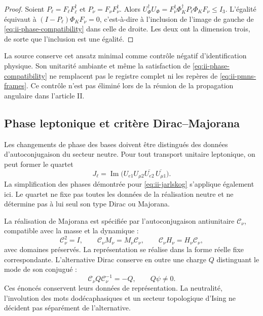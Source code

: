\begin{proof}
Soient \(P_\ell=F_\ell F_\ell^\dagger\) et
\(P_\nu=F_\nu F_\nu^\dagger\). Alors
\(U_\Phi^\dagger U_\Phi
=F_\nu^\dagger\Phi_K^\dagger P_\ell\Phi_KF_\nu\le I_3\).
L'égalité équivaut à
\((I-P_\ell)\Phi_KF_\nu=0\), c'est-à-dire à l'inclusion de
l'image de gauche de \eqref{eq:ii-phase-compatibility} dans celle de droite.
Les deux ont la dimension trois, de sorte que l'inclusion est une égalité.
\end{proof}

La source \cite{mezcla} conserve cet ansatz minimal comme contrôle
négatif d'identification physique. Son unitarité ambiante et même la
satisfaction de \eqref{eq:ii-phase-compatibility} ne remplacent pas le
registre complet ni les repères de \eqref{eq:ii-pmns-frames}. Ce
contrôle n'est pas éliminé lors de la réunion de la propagation angulaire dans l'article II.

\begingroup\fontsize{10}{11.7}\selectfont
\setlength{\parskip}{2pt}\setlength{\abovedisplayskip}{5pt}\setlength{\belowdisplayskip}{5pt}
\subsection{Phase leptonique et critère Dirac--Majorana}

Les changements de phase des bases doivent être distingués des données
d'autoconjugaison du secteur neutre. Pour tout transport unitaire
leptonique, on peut former le quartet
\begin{equation}
 J_\ell=\operatorname{Im}
 \bigl(U_{e1}U_{\mu2}\overline{U_{e2}}\,
                        \overline{U_{\mu1}}\bigr).
 \label{eq:ii-leptonic-quartet}
\end{equation}
La simplification des phases démontrée pour \eqref{eq:ii-jarlskog}
s'applique également ici. Le quartet ne fixe pas toutes les données de la
réalisation neutre et ne détermine pas à lui seul son type Dirac ou Majorana.

La réalisation de Majorana est spécifiée par
l'autoconjugaison antiunitaire \(\mathcal C_\nu\), compatible avec la masse et la
dynamique :
\begin{equation}
 \mathcal C_\nu^2=I,\qquad
 \mathcal C_\nu M_\nu=M_\nu\mathcal C_\nu,\qquad
 \mathcal C_\nu H_\nu=H_\nu\mathcal C_\nu,
 \label{eq:ii-majorana-compatibility}
\end{equation}
avec domaines préservés. La représentation se réalise dans la forme réelle
fixe correspondante. L'alternative Dirac conserve en outre une charge
\(Q\) distinguant le mode de son conjugué :
\begin{equation}
 \mathcal C_\nu Q\mathcal C_\nu^{-1}=-Q,\qquad Q\psi\ne0.
 \label{eq:ii-dirac-charge}
\end{equation}
Ces énoncés conservent leurs données de représentation. La neutralité,
l'involution des mots dodécaphasiques et un secteur topologique d'Ising
ne décident pas séparément de l'alternative.

